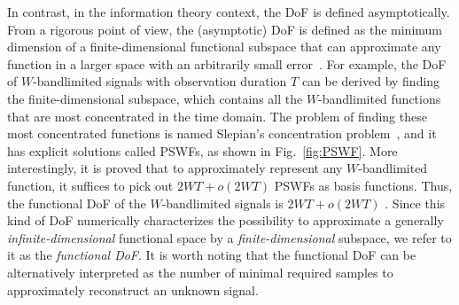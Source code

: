 \documentclass[journal,twocolumn]{IEEEtran}
\begin{document}
In contrast, in the information theory context, the DoF is defined asymptotically. From a rigorous point of view, the (asymptotic) DoF is defined as the minimum dimension of a finite-dimensional functional subspace that can approximate any function in a larger space with an arbitrarily small error~\cite{poon2005degrees}. For example, the DoF of $W$-bandlimited signals with observation duration $T$ can be derived by finding the finite-dimensional subspace, which contains all the $W$-bandlimited functions that are most concentrated in the time domain. The problem of finding these most concentrated functions is named Slepian's concentration problem~\cite{slepian1976bandwidth}, and it has explicit solutions called PSWFs, as shown in Fig.~\ref{fig:PSWF}.
More interestingly, it is proved that to approximately represent any $W$-bandlimited function, it suffices to pick out $2WT+o(2WT)$ PSWFs as basis functions. Thus, the functional DoF of the $W$-bandlimited signals is $2WT+o(2WT)$ \cite{slepian1976bandwidth}. 
Since this kind of DoF numerically characterizes the possibility to approximate a generally {\emph{ infinite-dimensional}} functional space by a {\emph{finite-dimensional}} subspace, we refer to it as the {{\emph{functional DoF}}}. 
It is worth noting that the functional DoF can be alternatively interpreted as the number of minimal required samples to approximately reconstruct an unknown signal. 




\end{document}
